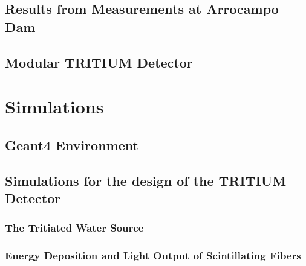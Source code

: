 \documentclass[12pt,a4paper]{book}
\begin{document}
	\section[Experimental Results in Arrocampo Dam]{Results from Measurements at Arrocampo Dam}\label{sec:ResultsArrocampo}
	
	\newpage
		
	\section[Modular TRITIUM Detector]{Modular TRITIUM Detector}\label{sec:TritiumMonitor}
	
	\newpage

\chapter{Simulations}  \label{chap:Simulations}	%
	
	
	\section{Geant4 Environment}\label{sec:Geant4Environment}
	
	
	\section{Simulations for the design of the TRITIUM Detector}\label{sec:TRITIUMSimulationsDesign}
	
	
		\subsection[The Tritiated Water Source]{The Tritiated Water Source}\label{subsec:SourceShapeSimulation}
		
		
		\subsection[Energy Deposition and Light Output of Scintillating Fibers]{Energy Deposition and Light Output of Scintillating Fibers}\label{subsec:LightOutputFibers}
		
		
\end{document}
